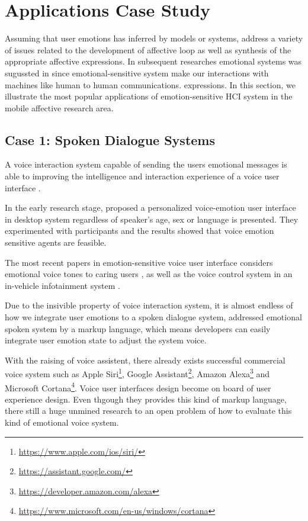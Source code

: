 \section{Applications Case Study}\label{sec:applications}

Assuming that user emotions has inferred by models or systems, \cite{Conati2005} address a variety of issues related to the development of affective loop as well as synthesis of the appropriate affective expressions. In subsequent researches emotional systems was sugussted in \cite{Crane2007} since emotional-sensitive system make our interactions with machines like human to human communications\cite{picard1999affective}.
expressions. In this section, we illustrate the most popular applications of emotion-sensitive HCI system in the mobile affective research area.

\subsection{Case 1: Spoken Dialogue Systems}

A voice interaction system capable of sending the users emotional messages is able to improving the intelligence and interaction experience of a voice user interface \cite{surace2001voice}.

In the early research stage, \cite{kostov2000emotion} proposed a personalized voice-emotion user interface in desktop system regardless of speaker's age, sex or language is presented. They experimented with participants and the results showed that voice emotion sensitive agents are feasible.

The most recent papers in emotion-sensitive voice user interface considers emotional voice tones to caring users \cite{chang2016intelligent}, as well as the voice control system in an in-vehicle infotainment system \cite{kim2016effects}.

Due to the insivible property of voice interaction system, it is almost endless of how we integrate user emotions to a spoken dialogue system, \cite{mctear2016rise} addressed emotional spoken system by a markup language, which means developers can easily integrate user emotion state to adjust the system voice. 

With the raising of voice assistent, there already exists successful commercial voice system such as Apple Siri\footnote{\url{https://www.apple.com/ios/siri/}}, Google Assistant\footnote{\url{https://assistant.google.com/}}, Amazon Alexa\footnote{\url{https://developer.amazon.com/alexa}} and Microsoft Cortana\footnote{\url{https://www.microsoft.com/en-us/windows/cortana}}. Voice user interfaces design become on board of user experience design. Even thgough they provides this kind of markup language, there still a huge unmined research to an open problem of how to evaluate this kind of emotional voice system.

